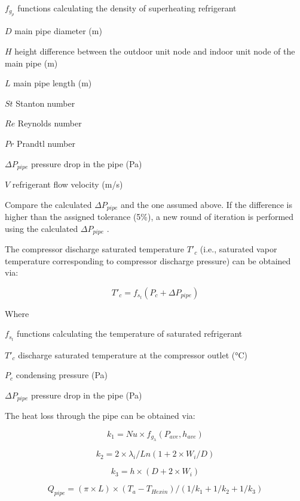 \(f_{g_\rho}\) functions calculating the density of superheating refrigerant

\(D\) main pipe diameter (m)

\(H\) height difference between the outdoor unit node and indoor unit node of the main pipe (m)

\(L\) main pipe length (m)

\(St\) Stanton number

\(Re\) Reynolds number

\(Pr\) Prandtl number

\(\Delta{P_{pipe}}\) pressure drop in the pipe (Pa)

\(V\) refrigerant flow velocity (m/s)

Compare the calculated \(\Delta{P_{pipe}}\) and the one assumed above. If the difference is higher than the assigned tolerance (5\%), a new round of iteration is performed using the calculated \(\Delta{P_{pipe}}\) .

The compressor discharge saturated temperature \(T'_c\) (i.e., saturated vapor temperature corresponding to compressor discharge pressure) can be obtained via:

\begin{equation}
T'_c = f_{s_t}(P_c+\Delta{P_{pipe}})
\end{equation}

Where

\(f_{s_t}\) functions calculating the temperature of saturated refrigerant

\(T'_c\) discharge saturated temperature at the compressor outlet (°C)

\(P_c\) condensing pressure (Pa)

\(\Delta{P_{pipe}}\) pressure drop in the pipe (Pa)

The heat loss through the pipe can be obtained via:

\begin{equation}
k_1 = Nu\times{f_{g_\lambda}(P_{ave},h_{ave})}
\end{equation}

\begin{equation}
k_2 = 2\times{\lambda_i}/Ln(1+2\times{W_i}/D)
\end{equation}

\begin{equation}
k_3 = h\times(D+2\times{W_i})
\end{equation}

\begin{equation}
Q_{pipe} = (\pi\times{L})\times(T_a-T_{Hexin})/(1/k_1+1/k_2+1/k_3)
\end{equation}

